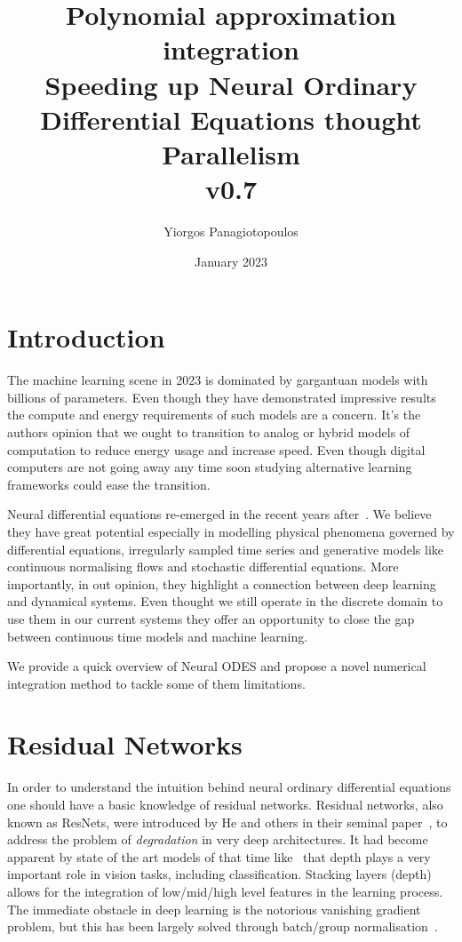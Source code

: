 \documentclass{article}
\title{Polynomial approximation integration  \\ \large{Speeding up Neural Ordinary Differential Equations thought Parallelism} \\ v0.7}
\author{Yiorgos Panagiotopoulos}
\date{January 2023}
\begin{document}
    \maketitle


    \section{Introduction}
    The machine learning scene in 2023 is dominated by gargantuan models with billions of parameters.
    Even though they have demonstrated impressive results the compute and energy requirements of such models are a
    concern.
    It's the authors opinion that we ought to transition to analog or hybrid models of computation to reduce energy
    usage and increase speed.
    Even though digital computers are not going away any time soon studying alternative learning frameworks could ease
    the transition.

    Neural differential equations re-emerged in the recent years after~\cite{chen2018neural}.
    We believe they have great potential especially in modelling physical phenomena governed by differential equations,
    irregularly sampled time series and generative models like continuous normalising flows and stochastic differential
    equations.
    More importantly, in out opinion, they highlight a connection between deep learning and dynamical systems.
    Even thought we still operate in the discrete domain to use them in our current systems they offer an opportunity
    to close the gap between continuous time models and machine learning.

    We provide a quick overview of Neural ODES and propose a novel numerical integration method to tackle some of
    them limitations.


    \section{Residual Networks}
    In order to understand the intuition behind neural ordinary differential equations one should have a basic knowledge
    of residual networks.
    Residual networks, also known as ResNets, were introduced by He and others in their seminal
    paper~\cite{He_2016_CVPR}, to address the problem of \textit{degradation} in very deep architectures.
    It had become apparent by state of the art models of that time like~\cite{simonyan2014very} that depth plays a very
    important role in vision tasks, including classification.
    Stacking layers (depth) allows for the integration of low/mid/high level features in the learning process.
    The immediate obstacle in deep learning is the notorious vanishing gradient problem, but this has been largely
    solved through batch/group normalisation~\cite{ioffe2015batch}.
\end{document}
